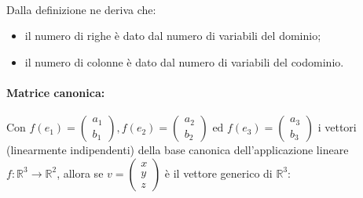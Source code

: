 \documentclass[a4paper]{article}
\begin{document}
        \paragraph{}
        Dalla definizione ne deriva che:
        \begin{itemize}
                \item il numero di righe \`{e} dato dal numero di variabili del dominio;
                \item il numero di colonne \`{e} dato dal numero di variabili del codominio.
        \end{itemize}

        \paragraph{Matrice canonica:}
        Con
        $
                f(e_1) = \begin{pmatrix} a_1 \\ b_1 \end{pmatrix},
                f(e_2) = \begin{pmatrix} a_2 \\ b_2 \end{pmatrix} \mbox{ ed }
                f(e_3) = \begin{pmatrix} a_3 \\ b_3 \end{pmatrix}
        $
        i vettori (linearmente indipendenti) della base canonica dell'applicazione lineare
        $
                f: \mathbb{R}^3 \rightarrow \mathbb{R}^2
        $,
        allora se
        $
                v = \begin{pmatrix} x \\ y \\ z \end{pmatrix}
        $
        \`{e} il vettore generico di $\mathbb{R}^3$:
\end{document}
